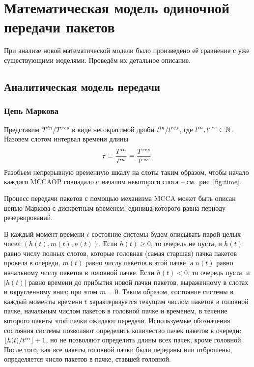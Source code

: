 \chapter{Математическая модель одиночной передачи пакетов}
\label{chapter:model_noBlockAck}

При анализе новой математической модели было произведено её сравнение с уже существующими моделями. Проведём их детальное описание.

\section{Аналитическая модель передачи}
\label{analyticalModel1}
\subsection{Цепь Маркова}

Представим $T^{in}/T^{res}$ в виде несократимой дроби $t^{in}/t^{res}$, где $t^{in}, t^{res}\in\mathbb{N}$. Назовем слотом интервал времени длины $$\tau = \frac{T^{in}}{t^{in}} \equiv \frac{T^{res}}{t^{res}}.$$ Разобьем непрерывную временную шкалу на слоты таким образом, чтобы начало каждого MCCAOP совпадало с началом некоторого слота -- см.~рис~\ref{fig:time}.

Процесс передачи пакетов с помощью механизма MCCA может быть описан цепью Маркова с дискретным временем, единица которого равна периоду резервирований.



В каждый момент времени $t$ состояние системы будем описывать парой целых чисел $(h(t), m(t), n(t))$. Если $h(t) \geqslant 0$, то очередь не пуста, и $h(t)$ равно числу полных слотов, которые головная (самая старшая) пачка пакетов провела в очереди, $m(t)$ равно числу пакетов в этой пачке, а $n(t)$ равно начальному числу пакетов в головной пачке. Если $h(t) < 0$, то очередь пуста, и $|h(t)|$ равно времени до прибытия новой пачки пакетов, выраженному в слотах и округленному вниз; при этом $m=0$. Таким образом, состояние системы в каждый моменты времени $t$ характеризуется текущим числом пакетов в головной пачке, начальным числом пакетов  в головной пачке и временем, в течение которого пакеты этой пачки ожидают передачи. Используемые обозначения состояния системы позволяют определить количество пачек пакетов в очереди:  $\lfloor h(t)/t^{in} \rfloor + 1$, но не позволяют определить длины всех пачек, кроме головной. После того, как все пакеты головной пачки были переданы или отброшены, определяется число пакетов в пачке, ставшей головной.
  
